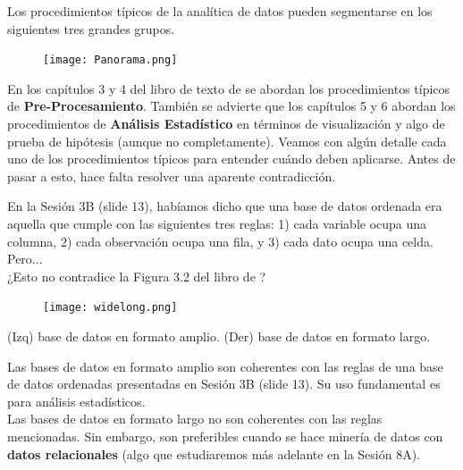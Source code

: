 \documentclass[aspectratio=169]{beamer}
\begin{document}
\begin{frame}
Los procedimientos típicos de la analítica de datos pueden segmentarse en los siguientes tres grandes grupos.
\begin{figure}
\centering
\texttt{[image: Panorama.png]}
\end{figure}
\end{frame}

\begin{frame}
En los capítulos 3 y 4 del libro de texto de \citeauthor{Shmueli2020} \citeyear{Shmueli2020} se abordan los procedimientos típicos de \textbf{Pre-Procesamiento}. También se advierte que los capítulos 5 y 6 abordan los procedimientos de \textbf{Análisis Estadístico} en términos de visualización y algo de prueba de hipótesis (aunque no completamente). Veamos con algún detalle cada uno de los procedimientos típicos para entender cuándo deben aplicarse. Antes de pasar a esto, hace falta resolver una aparente contradicción.
\end{frame}

\begin{frame}
En la Sesión 3B (slide 13), habíamos dicho que una base de datos ordenada era aquella que cumple con las siguientes tres reglas: 1) cada variable ocupa una columna, 2) cada observación ocupa una fila, y 3) cada dato ocupa una celda. Pero... \\
¿Esto no contradice la Figura 3.2 del libro de \citeauthor{Shmueli2020} \citeyear{Shmueli2020}?
\begin{figure}
\centering
\texttt{[image: widelong.png]}
\end{figure}
\centering
(Izq) base de datos en formato amplio. (Der) base de datos en formato largo.
\end{frame}

\begin{frame}
Las bases de datos en formato amplio son coherentes con las reglas de una base de datos ordenadas presentadas en Sesión 3B (slide 13). Su uso fundamental es para análisis estadísticos.\\
\vspace{0.5cm}
Las bases de datos en formato largo no son coherentes con las reglas mencionadas. Sin embargo, son preferibles cuando se hace minería de datos con \textbf{datos relacionales} (algo que estudiaremos más adelante en la Sesión 8A).
\end{frame}
\end{document}
